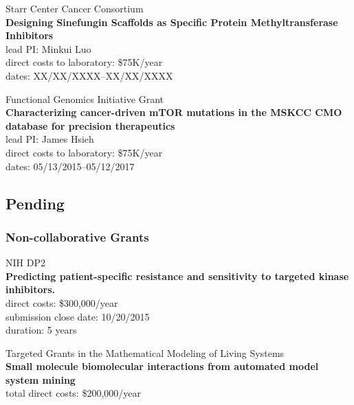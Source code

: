 \documentclass[10pt]{article}
\begin{document}
Starr Center Cancer Consortium\\
{\bf Designing Sinefungin Scaffolds as Specific Protein Methyltransferase Inhibitors}\\
lead PI: Minkui Luo \\
direct costs to laboratory: {\color{red}\$75K/year} \\
dates: {\color{red} XX/XX/XXXX--XX/XX/XXXX}

\vspace{2ex}

Functional Genomics Initiative Grant\\
{\bf Characterizing cancer-driven mTOR mutations in the MSKCC CMO database for precision therapeutics}\\
lead PI: James Hsieh\\
direct costs to laboratory: {\color{red}\$75K/year} \\
dates: 05/13/2015--05/12/2017

\eject
\subsection*{Pending}

\subsubsection*{Non-collaborative Grants}


NIH DP2\\
{\bf Predicting patient-specific resistance and sensitivity to targeted kinase inhibitors.}\\
direct costs: \$300,000/year\\
submission close date: 10/20/2015\\
duration: 5 years

\vspace{2ex}

Targeted Grants in the Mathematical Modeling of Living Systems\\
{\bf Small molecule biomolecular interactions from automated model system mining}\\
total direct costs: \$200,000/year
\end{document}
